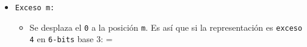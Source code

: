 \begin{itemize}[label=\iconTeoriaUno]
\begin{itemize}[label=\iconTeoriaDos]
\begin{itemize}[label=\iconTeoriaTres]
                  \item \textit{Sign extension:}
                        Para encontrar la representación de un número conocido con más bits.\par
                        Copio el signo al resto de los númerosengo que mandar el bit del signo
                        hacia el dígito más significativo, :
                        \begin{center}
                          {\tt 4 bits:  =  y  = }\par
                          Extendido a 8 bits:  =  y  = \par
                        \end{center}
                \end{itemize}
        \end{itemize}
  \item \texttt{Exceso m:}
        \begin{itemize}[label=\iconTeoriaTres]

          \item Se desplaza el \texttt{0} a la posición \texttt{m}. Es así que si la representación es
                \texttt{exceso 4} en \texttt{6-bits} base 3:  = 
        \end{itemize}


\end{itemize}
